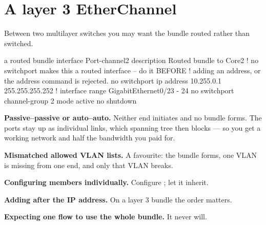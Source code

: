 \section{A layer 3 EtherChannel}

Between two multilayer switches you may want the bundle routed rather than
switched.

\begin{config}{a routed bundle}
interface Port-channel2
 description Routed bundle to Core2
 ! no switchport makes this a routed interface -- do it BEFORE
 ! adding an address, or the address command is rejected.
 no switchport
 ip address 10.255.0.1 255.255.255.252
!
interface range GigabitEthernet0/23 - 24
 no switchport
 channel-group 2 mode active
 no shutdown
\end{config}

\begin{pitfall}
\begin{tight}
  \item \textbf{Passive--passive or auto--auto.} Neither end initiates and no
        bundle forms. The ports stay up as individual links, which spanning tree
        then blocks --- so you get a working network and half the bandwidth you
        paid for.
  \item \textbf{Mismatched allowed VLAN lists.} A favourite: the bundle forms,
        one VLAN is missing from one end, and only that VLAN breaks.
  \item \textbf{Configuring members individually.} Configure
        ; let it inherit.
  \item \textbf{Adding  after the IP address.} On a layer 3
        bundle the order matters.
  \item \textbf{Expecting one flow to use the whole bundle.} It never will.
\end{tight}
\end{pitfall}

